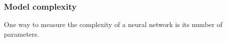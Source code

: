 \documentclass[9pt]{beamer}
\begin{document}



\begin{frame}
  \frametitle{Model complexity}

  One way to measure the complexity of a neural network is its number
  of parameters.

  \bigskip

  \begin{itemize}
    \bigskip
  \end{itemize}

\end{frame}






\end{document}
